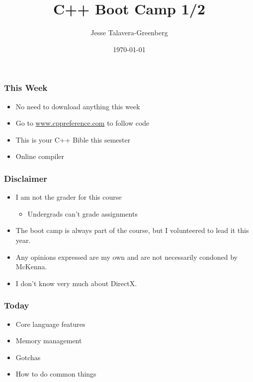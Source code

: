 \documentclass[glossy]{beamer}
\title{C++ Boot Camp 1/2}
\author{Jesse Talavera-Greenberg}
\date{\today}
\begin{document}
\newcommand{\cppref}[2]{\href{http://en.cppreference.com/w/cpp/#1}{\underline{#2}}}

\begin{frame}
\maketitle
\end{frame}

\begin{frame}
\frametitle{This Week}
  \begin{itemize}
    \item No need to download anything this week
    \item Go to \href{www.cppreference.com}{www.cppreference.com} to follow code
    \item This is your C++ Bible this semester
    \item Online compiler
  \end{itemize}
\end{frame}

\begin{frame}
\frametitle{Disclaimer}
    \begin{itemize}
        \item I am not the grader for this course
        \begin{itemize}
            \item Undergrads can't grade assignments
        \end{itemize}
        \item The boot camp is always part of the course, but I volunteered to lead it this year.
        \item Any opinions expressed are my own and are not necessarily condoned by McKenna.
        \item I don't know very much about DirectX.
    \end{itemize}
\end{frame}

\begin{frame}
  \frametitle{Today}
  \begin{itemize}
    \item Core language features
    \item Memory management
    \item Gotchas
    \item How to do common things
  \end{itemize}
\end{frame}
\end{document}
